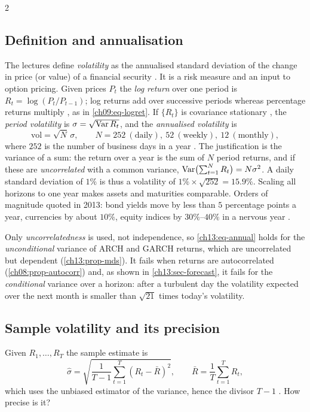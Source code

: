 \begin{paracol}{2}
\subsection{Definition and annualisation}\label{ch13:sec-def}
The lectures define \emph{volatility} as the annualised standard deviation of the change in price (or value) of a
financial security . It is a risk measure and an input to option pricing.
Given prices $P_t$ the \emph{log return} over one period is $R_t=\log(P_t/P_{t-1})$; log returns add over
successive periods whereas percentage returns multiply , as in \cref{ch09:eq-logret}. If $\{R_t\}$ is
covariance stationary , the \emph{period volatility} is $\sigma=\sqrt{\operatorname{Var} R_t}$, and the
\emph{annualised volatility} is
\begin{equation}\label{ch13:eq-annual}
  \mathrm{vol}=\sqrt N\,\sigma,\qquad N=252\ (\text{daily}),\ 52\ (\text{weekly}),\ 12\ (\text{monthly}),
\end{equation}
where $252$ is the number of business days in a year . The justification is
the variance of a sum: the return over a year is the sum of $N$ period returns, and if these are
\emph{uncorrelated} with a common variance, $\operatorname{Var}\bigl(\sum_{t=1}^NR_t\bigr)=N\sigma^2$. A daily standard deviation of
$1\%$ is thus a volatility of $1\%\times\sqrt{252}=15.9\%$. Scaling all horizons to one year makes assets and
maturities comparable. Orders of magnitude quoted in 2013: bond yields move by less than $5$ percentage points a
year, currencies by about $10\%$, equity indices by $30\%$--$40\%$ in a nervous year .

\begin{remark}\label{ch13:rem-sqrt}
Only \emph{uncorrelatedness} is used, not independence, so \eqref{ch13:eq-annual} holds for the
\emph{unconditional} variance of ARCH and GARCH returns, which are uncorrelated but dependent
(\cref{ch13:prop-mds}). It fails when returns are autocorrelated (\cref{ch08:prop-autocorr}) and, as shown in
\cref{ch13:sec-forecast}, it fails for the \emph{conditional} variance over a horizon: after a turbulent day
the volatility expected over the next month is smaller than $\sqrt{21}$ times today's volatility.
\end{remark}

\subsection{Sample volatility and its precision}\label{ch13:sec-sample}
Given $R_1,\dots,R_T$ the sample estimate is
\begin{equation}\label{ch13:eq-samplevol}
  \hat\sigma=\sqrt{\frac1{T-1}\sum_{t=1}^T(R_t-\bar R)^2},\qquad \bar R=\frac1T\sum_{t=1}^TR_t,
\end{equation}
which uses the unbiased estimator of the variance, hence the divisor $T-1$ . How precise is it?


\end{paracol}
